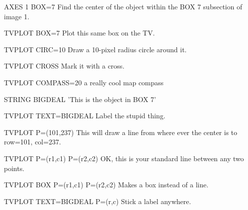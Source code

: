 {\newpage\clearpage
{}%
\begin{example}
  \item[AXES 1 BOX=7\hfill]{Find the center of the object within
       the BOX 7 subsection of image 1.}
  \item[TVPLOT BOX=7\hfill]{Plot this same box on the TV.}
  \item[TVPLOT CIRC=10\hfill]{Draw a 10-pixel radius circle around it.}
  \item[TVPLOT CROSS\hfill]{Mark it with a cross.}
  \item[TVPLOT COMPASS=20\hfill]{a really cool map compass}
  \item[STRING BIGDEAL  'This is the object in BOX 7']{}
  \item[TVPLOT TEXT=BIGDEAL\hfill]{Label the stupid thing.}
\end{example}%
\lthtmlfigureZ
\lthtmlcheckvsize\clearpage}

{\newpage\clearpage
{}%
\begin{example}
  \item[TVPLOT P=(101,237)\hfill]{This will draw a line from where ever
       the center is to row=101, col=237.}
  \item[TVPLOT P=(r1,c1) P=(r2,c2)\hfill]{OK, this is your standard line
       between any two points.}
  \item[TVPLOT BOX P=(r1,c1) P=(r2,c2)\hfill]{Makes a box instead of a line.}
  \item[TVPLOT TEXT=BIGDEAL P=(r,c)\hfill]{Stick a label anywhere.}
\end{example}%
\lthtmlfigureZ
\lthtmlcheckvsize\clearpage}

